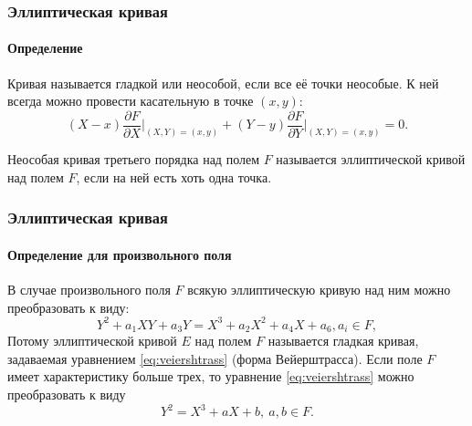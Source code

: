 \begin{frame}
    \frametitle{Эллиптическая кривая}
    \framesubtitle{Определение}
    
    \begin{definition}
        Кривая называется \alert{гладкой} или \alert{неособой}, если все её точки \alert{неособые}. К ней всегда можно провести касательную в точке $(x,y)$:
        \[(X-x){\frac{\partial F}{\partial X}}\Biggl|_{(X,Y)=(x,y)} + (Y-y){\frac{\partial F}{\partial Y}}\Biggl|_{(X,Y)=(x,y)} = 0.\]
        
        \alert{Неособая} кривая третьего порядка над полем $F$ называется \alert{эллиптической кривой} над полем $F$, если на ней есть хоть одна точка. 
    \end{definition}
\end{frame}


\begin{frame}
    \frametitle{Эллиптическая кривая}
    \framesubtitle{Определение для произвольного поля}
    
    \begin{definition}
        В случае произвольного поля $F$ всякую эллиптическую кривую над ним можно преобразовать к виду:
        \begin{equation}\label{eq:veiershtrass}Y^2+a_1XY+a_3Y=X^3+a_2X^2+a_4X+a_6, a_i\in F,\end{equation}
        Потому \alert{эллиптической} кривой $E$ над полем $F$ называется гладкая кривая, задаваемая уравнением \eqref{eq:veiershtrass} (форма Вейерштрасса).
        Если поле $F$ имеет характеристику больше трех, то уравнение \eqref{eq:veiershtrass} можно преобразовать к виду
        \begin{equation}\label{eq:ellCurveChar3}Y^2=X^3+aX+b,\ a, b\in F.\end{equation}
    \end{definition}
\end{frame}


